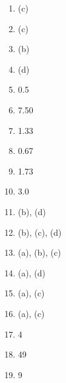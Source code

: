 \documentclass{article}
\begin{document}
\begin{multicols}{4}
    \begin{enumerate}
        \item (c)
        \item (c)
        \item (b)
        \item (d)
        \item 0.5
        \item 7.50
        \item 1.33
        \item 0.67
        \item 1.73
        \item 3.0
        \item (b), (d)
        \item (b), (c), (d)
        \item (a), (b), (c)
        \item (a), (d)
        \item (a), (c)
        \item (a), (c)
        \item 4
        \item 49
        \item 9
    \end{enumerate}
\end{multicols}
\end{document}
